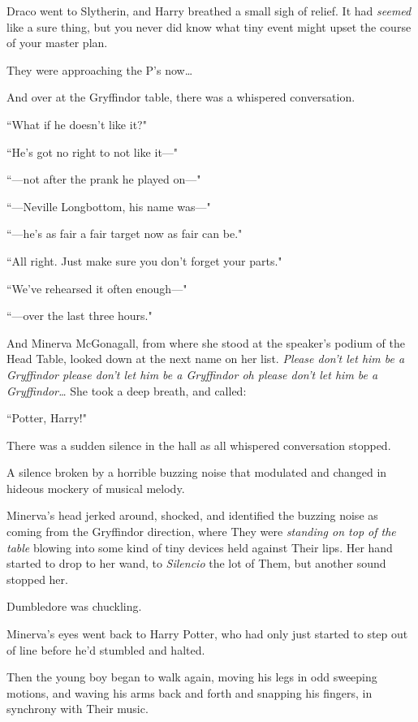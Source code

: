 \later

Draco went to Slytherin, and Harry breathed a small sigh of relief. It had \emph{seemed} like a sure thing, but you never did know what tiny event might upset the course of your master plan.

They were approaching the P's now{\ldots}

And over at the Gryffindor table, there was a whispered conversation.

\begin{em}
``What if he doesn't like it?"

``He's got no right to not like it—"

``—not after the prank he played on—"

``—Neville Longbottom, his name was—"

``—he's as fair a fair target now as fair can be."

``All right. Just make sure you don't forget your parts."

``We've rehearsed it often enough—"

``—over the last three hours."
\end{em}

And Minerva McGonagall, from where she stood at the speaker's podium of the Head Table, looked down at the next name on her list. \emph{Please don't let him be a Gryffindor please don't let him be a Gryffindor \emph{oh please} don't let him be a Gryffindor{\ldots}} She took a deep breath, and called:

``Potter, Harry!"

There was a sudden silence in the hall as all whispered conversation stopped.

A silence broken by a horrible buzzing noise that modulated and changed in hideous mockery of musical melody.

Minerva's head jerked around, shocked, and identified the buzzing noise as coming from the Gryffindor direction, where They were \emph{standing on top of the table} blowing into some kind of tiny devices held against Their lips. Her hand started to drop to her wand, to \emph{Silencio} the lot of Them, but another sound stopped her.

Dumbledore was chuckling.

Minerva's eyes went back to Harry Potter, who had only just started to step out of line before he'd stumbled and halted.

Then the young boy began to walk again, moving his legs in odd sweeping motions, and waving his arms back and forth and snapping his fingers, in synchrony with Their music.

